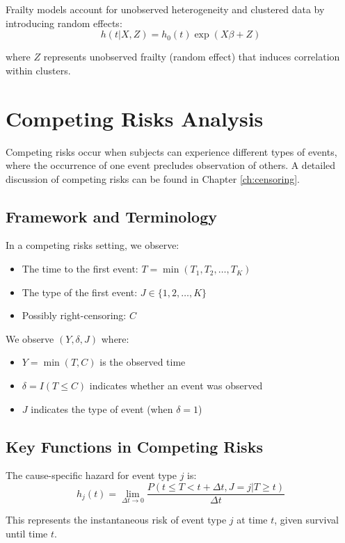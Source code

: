 Frailty models account for unobserved heterogeneity and clustered data by introducing random effects:
\begin{equation}
    h(t|X, Z) = h_0(t) \exp(X\beta + Z)
\end{equation}

where $Z$ represents unobserved frailty (random effect) that induces correlation within clusters.

\section{Competing Risks Analysis}

Competing risks occur when subjects can experience different types of events, where the occurrence of one event precludes observation of others. A detailed discussion of competing risks can be found in Chapter \ref{ch:censoring}.

\subsection{Framework and Terminology}

In a competing risks setting, we observe:
\begin{itemize}
    \item The time to the first event: $T = \min(T_1, T_2, \ldots, T_K)$
    \item The type of the first event: $J \in \{1, 2, \ldots, K\}$
    \item Possibly right-censoring: $C$
\end{itemize}

We observe $(Y, \delta, J)$ where:
\begin{itemize}
    \item $Y = \min(T, C)$ is the observed time
    \item $\delta = I(T \leq C)$ indicates whether an event was observed
    \item $J$ indicates the type of event (when $\delta = 1$)
\end{itemize}

\subsection{Key Functions in Competing Risks}

\begin{definitionbox}[title=Cause-Specific Hazard]
The cause-specific hazard for event type $j$ is:
\begin{equation}
    h_j(t) = \lim_{\Delta t \to 0} \frac{P(t \leq T < t + \Delta t, J = j | T \geq t)}{\Delta t}
\end{equation}

This represents the instantaneous risk of event type $j$ at time $t$, given survival until time $t$.
\end{definitionbox}

